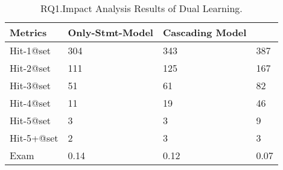 \begin{table}[t]
	\caption{RQ1.Impact Analysis Results of Dual Learning.}
	{\small
		\begin{center}
			\renewcommand{\arraystretch}{1}
			\begin{tabular}{p{1.35cm}<{\centering}|p{2.4cm}<{\centering}|p{1.7cm}<{\centering}|p{1.2cm}<{\centering}}
				\hline
				Metrics & Only-Stmt-Model & Cascading Model &  \tool \\			
				\hline
				Hit-1@set   & 304 & 343 & 387 \\
				Hit-2@set	& 111 & 125 & 167\\
				Hit-3@set	& 51 & 61 & 82\\
				Hit-4@set	& 11 & 19 & 46\\
				Hit-5@set	& 3 & 3 & 9\\
				Hit-5+@set	& 2 & 3 & 3\\
				Exam     	& 0.14 & 0.12 & 0.07\\
				\hline
			\end{tabular}
			
			\label{fig:rq2-1}
		\end{center}
	}
\end{table}
